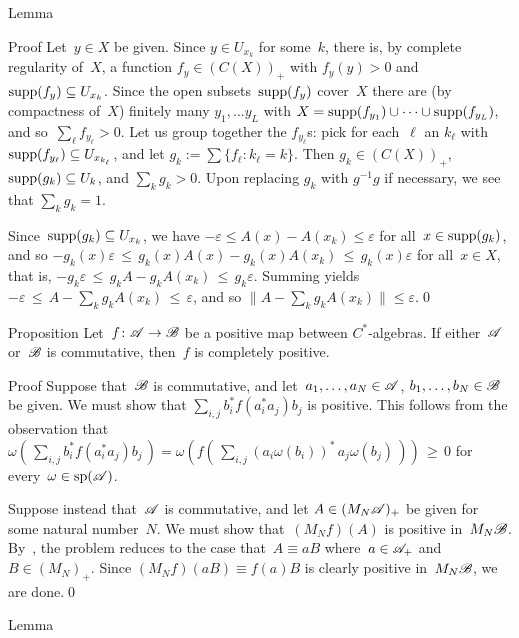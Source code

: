\documentclass[a]{subfiles}
\begin{document}
\begin{parsec}
\begin{point}{Lemma}
\begin{point}{Proof}
Let~$y\in X$ be given. Since $y\in U_{x_k}$
for some~$k$, there is, by complete regularity of~$X$,
a function $f_y\in (C(X))_+$
with $f_y(y)>0$
and $\operatorname{supp}(f_y)\subseteq U_{x_k}$.
Since the open subsets~$\operatorname{supp}(f_y)$
cover~$X$
there are (by compactness of~$X$) finitely many $y_1,\dotsc y_L$
with $X = \operatorname{supp}(f_{y_1})\cup \dotsb \cup \operatorname{supp}(f_{y_L})$,
and so~$\sum_\ell f_{y_\ell} > 0$.
Let us group together the $f_{y_\ell}$s:
pick for each~$\ell$ an $k_\ell$ with $\operatorname{supp}(f_{y_\ell})\subseteq 
U_{x_{k_\ell}}$,
and let $g_k:= \sum\{f_\ell\colon k_\ell = k\}$.
Then $g_k\in (C(X))_+$,
$\operatorname{supp}(g_k)\subseteq U_k$,
and $\sum_k g_k >0$.
Upon replacing $g_k$ with $g^{-1} g$ if necessary,
we see that $\sum_k g_k=1$.

Since~$\operatorname{supp}(g_k)\subseteq U_{x_k}$,
we have $-\varepsilon \leq A(x)-A(x_k)\leq \varepsilon$
for all~$x\in \operatorname{supp}(g_k)$,
and so  $-g_k(x) \varepsilon
\,\leq\, g_k(x) A(x) - g_k(x) A(x_k)\,\leq\, g_k(x) \varepsilon$
for all~$x\in X$,
that is,  $-g_k \varepsilon
\,\leq\, g_k A - g_k A(x_k)\,\leq\, g_k \varepsilon$.
Summing yields
$-\varepsilon \,\leq\, A- \sum_k g_k A(x_k)\,\leq\, \varepsilon$,
and so $\|A-\sum_k g_k A(x_k)\|\leq \varepsilon$.\qed
\end{point}
\end{point}
\begin{point}[cp-commutative]{Proposition}%
Let~$f\colon \mathscr{A}\to\mathscr{B}$ be a 
positive map between $C^*$-algebras.
If either~$\mathscr{A}$ or~$\mathscr{B}$ is commutative,
then~$f$ is completely positive.
\begin{point}{Proof}%
Suppose that~$\mathscr{B}$ is commutative,
and let~$a_1,\dotsc,a_N\in \mathscr{A}$,
$b_1,\dotsc,b_N\in\mathscr{B}$ be given.
We must
show that $\sum_{i,j} b_i^*f(a_i^*a_j)b_j$ is positive.
This follows from the observation that
$\omega(\,\sum_{i,j} b_i^*f(a_i^*a_j)b_j\,)
= \omega(f(\,\sum_{i,j}(a_i\omega(b_i))^*\,a_j \omega(b_j)\,))\,\geq \,0$
for every~$\omega\in\mathrm{sp}(\mathscr{A})$.
\begin{point}%
Suppose instead that~$\mathscr{A}$ is commutative,
and let $A\in (M_N\mathscr{A})_+$
be given for some natural number~$N$.
We must show that~$(M_Nf)(A)$ is positive in~$M_N\mathscr{B}$.
By~,
the problem reduces to the case that~$A\equiv a B$
where~$a\in \mathscr{A}_+$ and~$B\in (M_N)_+$.
Since $(M_Nf)(aB)\equiv f(a)B$ is clearly positive
in~$M_N\mathscr{B}$,
we are done.\qed
\end{point}
\end{point}
\end{point}
\begin{point}{Lemma}%

\end{point}
\end{parsec}
\end{document}
